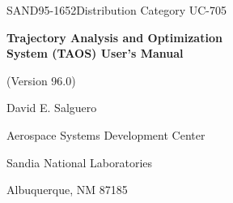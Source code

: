 \begin{titlepage}
\centering
{\small SAND95-1652\hfill Distribution Category UC-705\par}
\vspace{2cm}
{\LARGE\bfseries Trajectory Analysis and Optimization\\System (TAOS) User's Manual\par}
\vspace{0.4cm}
{\large (Version 96.0)\par}
\vspace{1.5cm}
David E. Salguero\par
Aerospace Systems Development Center\par
Sandia National Laboratories\par
Albuquerque, NM 87185\par
\vfill
\end{titlepage}
